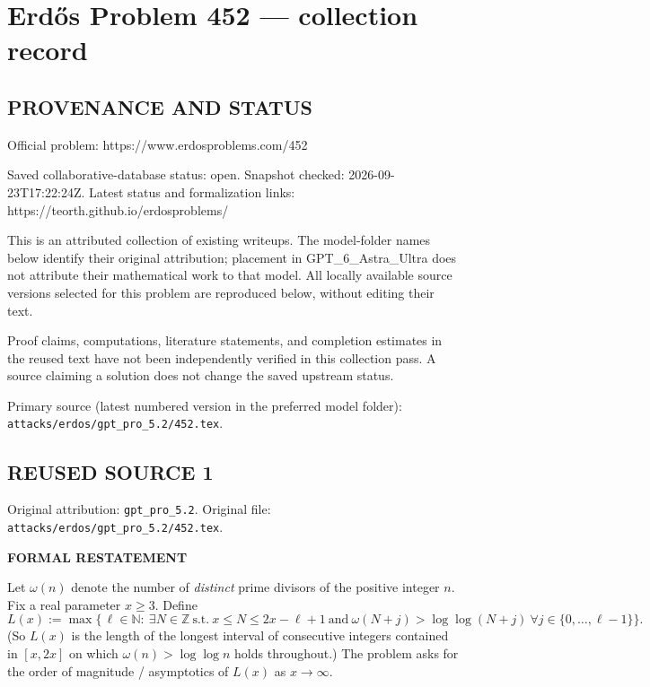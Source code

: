 \section*{Erd\H{o}s Problem 452 --- collection record}

\subsection*{PROVENANCE AND STATUS}
Official problem: https://www.erdosproblems.com/452

Saved collaborative-database status: open.
Snapshot checked: 2026-09-23T17:22:24Z.
Latest status and formalization links: https://teorth.github.io/erdosproblems/

This is an attributed collection of existing writeups. The model-folder names below identify their original attribution; placement in GPT\_6\_Astra\_Ultra does not attribute their mathematical work to that model. All locally available source versions selected for this problem are reproduced below, without editing their text.

Proof claims, computations, literature statements, and completion estimates in the reused text have not been independently verified in this collection pass. A source claiming a solution does not change the saved upstream status.

Primary source (latest numbered version in the preferred model folder): \texttt{attacks/erdos/gpt\_pro\_5.2/452.tex}.

\subsection*{REUSED SOURCE 1}
Original attribution: \texttt{gpt\_pro\_5.2}.
Original file: \texttt{attacks/erdos/gpt\_pro\_5.2/452.tex}.


\textbf{FORMAL RESTATEMENT}

Let $\omega(n)$ denote the number of \emph{distinct} prime divisors of the positive integer $n$.
Fix a real parameter $x\ge 3$. Define
\[
L(x):=\max\Big\{\,\ell\in\mathbb N:\ \exists N\in\mathbb Z\ \text{s.t.}\ x\le N\le 2x-\ell+1\ \text{and}\ \omega(N+j)>\log\log(N+j)\ \forall j\in\{0,\dots,\ell-1\}\Big\}.
\]
(So $L(x)$ is the length of the longest interval of consecutive integers contained in $[x,2x]$ on which $\omega(n)>\log\log n$ holds throughout.) The problem asks for the order of magnitude / asymptotics of $L(x)$ as $x\to\infty$.

